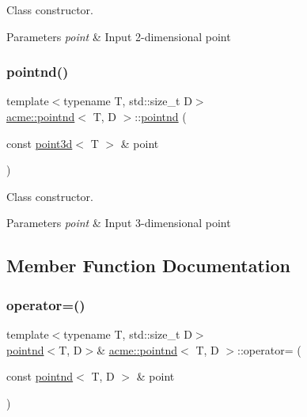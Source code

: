 Class constructor. 


\begin{DoxyParams}{Parameters}
{\em point} & Input 2-\/dimensional point \\
\hline
\end{DoxyParams}
\mbox{\label{classacme_1_1pointnd_a7f0e5434f15d3f5d2f97ba3d1dbcec6e}} 
\subsubsection{\texorpdfstring{pointnd()}{pointnd()}\hspace{0.1cm}{\footnotesize\ttfamily [7/7]}}
{\footnotesize\ttfamily template$<$typename T, std\+::size\+\_\+t D$>$ \\
\hyperlink{classacme_1_1pointnd}{acme\+::pointnd}$<$ T, D $>$\+::\hyperlink{classacme_1_1pointnd}{pointnd} (\begin{DoxyParamCaption}\item[{const \hyperlink{classacme_1_1point3d}{point3d}$<$ T $>$ \&}]{point }\end{DoxyParamCaption})\hspace{0.3cm}{\ttfamily [inline]}}



Class constructor. 


\begin{DoxyParams}{Parameters}
{\em point} & Input 3-\/dimensional point \\
\hline
\end{DoxyParams}


\subsection{Member Function Documentation}
\mbox{\label{classacme_1_1pointnd_ad4196b71eee0aef40771f864c23e9f13}} 
\subsubsection{\texorpdfstring{operator=()}{operator=()}\hspace{0.1cm}{\footnotesize\ttfamily [1/3]}}
{\footnotesize\ttfamily template$<$typename T, std\+::size\+\_\+t D$>$ \\
\hyperlink{classacme_1_1pointnd}{pointnd}$<$T, D$>$\& \hyperlink{classacme_1_1pointnd}{acme\+::pointnd}$<$ T, D $>$\+::operator= (\begin{DoxyParamCaption}\item[{const \hyperlink{classacme_1_1pointnd}{pointnd}$<$ T, D $>$ \&}]{point }\end{DoxyParamCaption})\hspace{0.3cm}{\ttfamily [inline]}}



